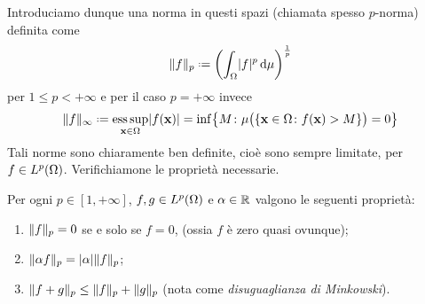 Introduciamo dunque una norma in questi spazi (chiamata spesso $p$-norma) definita come
\begin{equation}
    \norm{f}_p\defeq\biggl(\int_\Omega \abs{f}^p\,\dd\mu\biggr)^{\frac1{p}}
    \label{eq:p-norma-finita}
\end{equation}
per $1\le p<+\infty$ e per il caso $p=+\infty$ invece
\begin{equation}
    \norm{f}_\infty\defeq\esssup_{\vec x\in\Omega}\abs{f(\vec x)}=\inf\bigl\{M\colon\mu\bigl(\{\vec x\in\Omega\colon f(\vec x)>M\}\bigr)=0\bigr\}
    \label{eq:p-norma-infinita}
\end{equation}
Tali norme sono chiaramente ben definite, cioè sono sempre limitate, per $f\in\leb[p]{\Omega}$.
Verifichiamone le proprietà necessarie.
\begin{proprieta} \label{pr:norma}
    Per ogni $p\in[1,+\infty]$, $f,g\in\leb[p]{\Omega}$ e $\alpha\in\R$ valgono le seguenti proprietà:
    \begin{enumerate}
        \item $\norm{f}_p=0$ se e solo se $f=0$, (ossia $f$ è zero quasi ovunque);
        \item $\norm{\alpha f}_p=\abs{\alpha}\norm{f}_p$;
        \item $\norm{f+g}_p\le\norm{f}_p+\norm{g}_p$ (nota come \emph{disuguaglianza di Minkowski}).
    \end{enumerate}
\end{proprieta}
